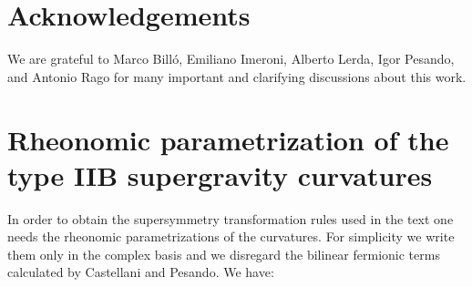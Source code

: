 \documentclass[a4paper,11pt]{article}
\begin{document}
\section*{Acknowledgements}
We are grateful to Marco Bill\'o, Emiliano Imeroni, Alberto Lerda, Igor Pesando, and Antonio Rago for many important and clarifying discussions about this work.
\par
\appendix
\section{Rheonomic parametrization of the type IIB supergravity
curvatures}
In order to obtain the supersymmetry transformation rules used in the
text one needs the rheonomic parametrizations of the curvatures.
For simplicity we write them only in the complex basis and we disregard the bilinear
fermionic terms calculated by Castellani and Pesando. We have:
\end{document}

